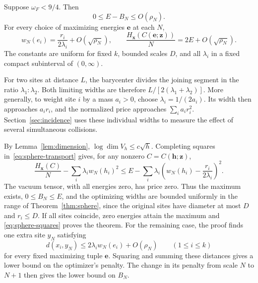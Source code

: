 \begin{theorem}\label{thm:sphere}
Suppose \(\omega_F<9/4\). Then
\begin{equation}\label{eq:sphere-estimate}
       0\le E-B_N\le O(\rho_N).
\end{equation}
For every choice of maximizing energies \(\mathbf e\) at each \(N\),
\begin{equation}\label{eq:sphere-profile}
 w_N(e_i)=\frac{r_i}{2\lambda_i}+O(\sqrt{\rho_N}),
 \qquad
 \frac{H_{\mathbf x}(C(\mathbf e;\mathbf z))}{N}=2E+O(\sqrt{\rho_N}).
\end{equation}
The constants are uniform for fixed \(k\), bounded scales \(D\), and all
\(\lambda_i\) in a fixed compact subinterval of \((0,\infty)\).
\end{theorem}

For two sites at distance \(L\), the barycenter divides the joining
segment in the ratio \(\lambda_1:\lambda_2\). Both limiting widths
are therefore \(L/[2(\lambda_1+\lambda_2)]\). More generally, to
weight site \(i\) by a mass \(a_i>0\), choose
\(\lambda_i=1/(2a_i)\). Its width then approaches \(a_i r_i\), and the
normalized price approaches \(\sum_i a_i r_i^2\). Section~\ref{sec:incidence}
uses these individual widths to measure the effect of several
simultaneous collisions.

By Lemma~\ref{lem:dimension}, \(\log\dim V_h\le c\sqrt h\).
Completing squares in~\eqref{eq:sphere-transport} gives, for any
nonzero \(C=C(\mathbf h;\mathbf z)\),
\begin{equation}\label{eq:sphere-squares}
 \frac{H_{\mathbf x}(C)}{N}-\sum_i\lambda_i w_N(h_i)^2
 \le E-\sum_i\lambda_i
             \left(w_N(h_i)-\frac{r_i}{2\lambda_i}\right)^2 .
\end{equation}
The vacuum tensor, with all energies zero, has price zero. Thus the
maximum exists, \(0\le B_N\le E\), and the optimizing widths are bounded
uniformly in the range of Theorem~\ref{thm:sphere}, since the original
sites have diameter at most \(D\) and \(r_i\le D\). If all sites
coincide, zero energies attain the maximum and
\eqref{eq:sphere-squares} proves the theorem. For the remaining case,
the proof finds one extra site \(y_N\) satisfying
\[
 d(x_i,y_N)\le 2\lambda_i w_N(e_i)+O(\rho_N)\qquad(1\le i\le k)
\]
for every fixed maximizing tuple \(\mathbf e\). Squaring and summing
these distances gives a lower bound on the optimizer's penalty.
The change in its penalty from scale \(N\) to \(N+1\) then gives the
lower bound on \(B_N\).

